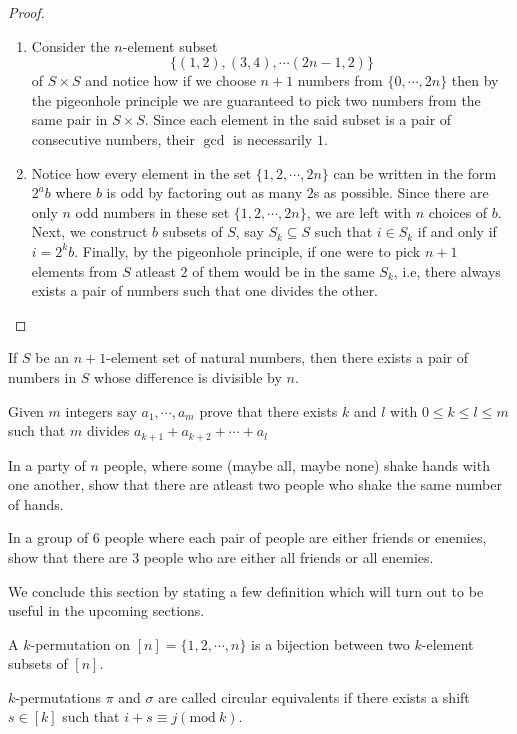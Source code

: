 \begin{proof}
\begin{enumerate}
\item Consider the $n$-element subset \[\{\left( 1,2 \right), \left( 3,4 \right), \cdots \left( 2n-1,2 \right)\}\] of $S\times S$ and notice how if we choose $n+1$ numbers from $\{0,\cdots,2n\}$ then by the pigeonhole principle we are guaranteed to pick two numbers from the same pair in $S\times S$. Since each element in the said subset is a pair of consecutive numbers, their $\gcd$ is necessarily $1$.
\item Notice how every element in the set $\{1,2,\cdots,2n\}$ can be written in the form $2^ab$ where $b$ is odd by factoring out as many $2$s as possible. Since there are only $n$ odd numbers in these set $\{1,2,\cdots,2n\}$, we are left with $n$ choices of $b$. Next, we construct $b$ subsets of $S$, say $S_k\subseteq S$ such that $i\in S_k$ if and only if $i=2^kb$. Finally, by the pigeonhole principle, if one were to pick $n+1$ elements from $S$ atleast $2$ of them would be in the same $S_k$, i.e, there always exists a pair of numbers such that one divides the other.
\end{enumerate}
\end{proof}
\begin{claim}
If $S$ be an $n+1$-element set of natural numbers, then there exists a pair of numbers in $S$ whose difference is divisible by $n$.
\end{claim}
\begin{claim}
Given $m$ integers say  $a_{1},\cdots,a_{m}$ prove that there exists $k$ and $l$ with  $0\leq k\leq l\leq m$ such that $m$ divides  $a_{k+1}+a_{k+2}+\cdots+a_{l}$
\end{claim}
\begin{claim}
In a party of $n$ people, where some (maybe all, maybe none) shake hands with one another, show that there are atleast two people who shake the same number of hands.
\end{claim}
\begin{claim}
In a group of $6$ people where each pair of people are either friends or enemies, show that there are  $3$ people who are either all friends or all enemies. 
\end{claim}

We conclude this section by stating a few definition which will turn out to be useful in the upcoming sections.
\begin{definition}[$k$-Permutation]
A $k$-permutation on $[n]=\{1,2,\cdots,n\}$ is a bijection between two $k$-element subsets of $[n]$. 
\end{definition}
\begin{definition}
	$k$-permutations  $\pi$ and $\sigma$ are called circular equivalents if there exists a shift  $s\in [k]$ such that  $i+s\equiv j(\text{mod} \ k)$.
\end{definition}
